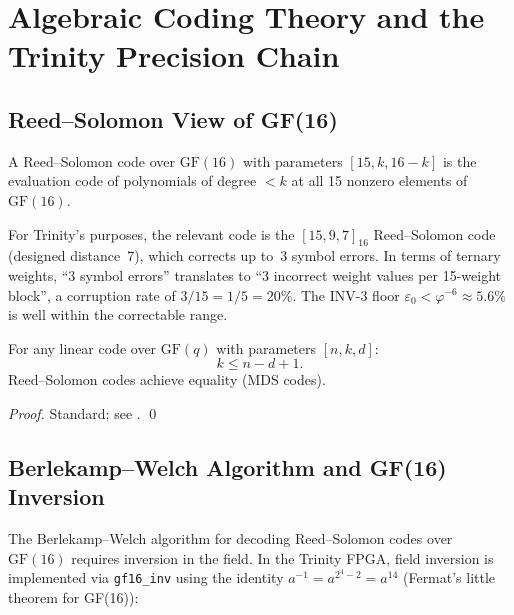 \section{Algebraic Coding Theory and the Trinity Precision Chain}
\label{sec:gf16-coding}

\subsection{Reed–Solomon View of GF(16)}

\begin{definition}
A Reed–Solomon code over \(\mathrm{GF}(16)\) with parameters
\([15, k, 16-k]\) is the evaluation code of polynomials of degree
\(<k\) at all 15 nonzero elements of \(\mathrm{GF}(16)\).
\end{definition}

For Trinity's purposes, the relevant code is the \([15,9,7]_{16}\)
Reed–Solomon code (designed distance~7), which corrects up to~3 symbol errors.
In terms of ternary weights, ``3 symbol errors'' translates to
``3 incorrect weight values per 15-weight block'', a corruption rate
of \(3/15=1/5=20\%\).
The INV-3 floor \(\varepsilon_0<\varphi^{-6}\approx 5.6\%\) is well within
the correctable range.

\begin{theorem}
\label{thm:singleton}
For any linear code over \(\mathrm{GF}(q)\) with parameters \([n,k,d]\):
\[
  k \leq n - d + 1.
\]
Reed–Solomon codes achieve equality (MDS codes).
\end{theorem}

\begin{proof}
Standard; see \textcite[Chapter~5]{macwilliams_sloane}.
\qed
\end{proof}

\subsection{Berlekamp–Welch Algorithm and GF(16) Inversion}

The Berlekamp–Welch algorithm for decoding Reed–Solomon codes
over \(\mathrm{GF}(16)\) requires inversion in the field.
In the Trinity FPGA, field inversion is implemented via
\texttt{gf16\_inv} using the identity
\(a^{-1} = a^{2^4-2} = a^{14}\) (Fermat's little theorem for GF(16)):

